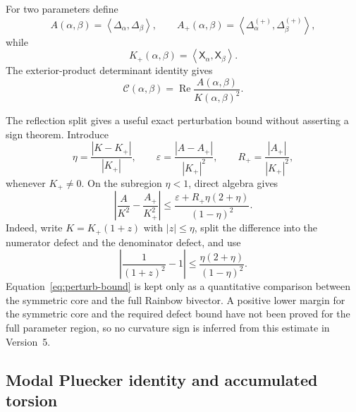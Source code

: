 \documentclass[11pt]{amsart}
\numberwithin{equation}{section}
\theoremstyle{plain}
\theoremstyle{definition}
\theoremstyle{remark}
\newcommand{\Ccal}{\mathcal C}
\newcommand{\Ree}{\operatorname{Re}}
\newcommand{\ip}[2]{\left\langle #1,#2\right\rangle}
\begin{document}
For two parameters define
\begin{equation}
A(\alpha,\beta)=\ip{\Delta_\alpha}{\Delta_\beta},
\qquad
A_+(\alpha,\beta)=\ip{\Delta_\alpha^{(+)}}{\Delta_\beta^{(+)}},
\end{equation}
while
\begin{equation}
K_+(\alpha,\beta)=\ip{\mathsf X_\alpha}{\mathsf X_\beta}.
\end{equation}
The exterior-product determinant identity gives
\begin{equation}
\boxed{
\Ccal(\alpha,\beta)=\Ree\frac{A(\alpha,\beta)}{K(\alpha,\beta)^2}.
}
\label{eq:C-Plucker}
\end{equation}

The reflection split gives a useful exact perturbation bound without asserting a sign theorem.  Introduce
\begin{equation}
\eta=\frac{|K-K_+|}{|K_+|},
\qquad
\varepsilon=\frac{|A-A_+|}{|K_+|^2},
\qquad
R_+=\frac{|A_+|}{|K_+|^2},
\label{eq:eta-epsilon-R}
\end{equation}
whenever $K_+\ne0$.  On the subregion $\eta<1$, direct algebra gives
\begin{equation}
\boxed{
\left|
\frac{A}{K^2}-\frac{A_+}{K_+^2}
\right|
\le
\frac{\varepsilon+R_+\eta(2+\eta)}{(1-\eta)^2}.
}
\label{eq:perturb-bound}
\end{equation}
Indeed, write $K=K_+(1+z)$ with $|z|\le\eta$, split the difference into the numerator defect and the denominator defect, and use
\begin{equation}
\left|\frac1{(1+z)^2}-1\right|
\le\frac{\eta(2+\eta)}{(1-\eta)^2}.
\end{equation}
Equation~\eqref{eq:perturb-bound} is kept only as a quantitative comparison between the symmetric core and the full Rainbow bivector.  A positive lower margin for the symmetric core and the required defect bound have not been proved for the full parameter region, so no curvature sign is inferred from this estimate in Version~5.

\subsection{Modal Pluecker identity and accumulated torsion}
\label{subsec:modal-plucker-torsion}
\end{document}
